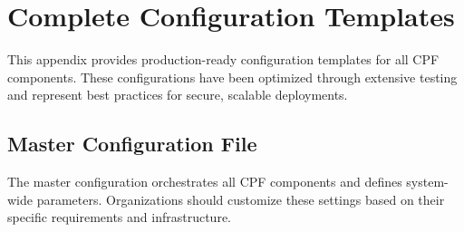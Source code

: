 \documentclass[11pt,a4paper]{article}
\begin{document}
\appendix

\section{Complete Configuration Templates}
\label{app:config}

This appendix provides production-ready configuration templates for all CPF components. These configurations have been optimized through extensive testing and represent best practices for secure, scalable deployments.

\subsection{Master Configuration File}

The master configuration orchestrates all CPF components and defines system-wide parameters. Organizations should customize these settings based on their specific requirements and infrastructure.
\end{document}
